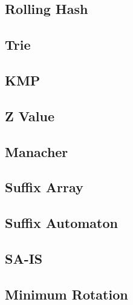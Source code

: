 \documentclass[a4paper,10pt,twocolumn,oneside]{article}
\begin{document}
\subsection{Rolling Hash}


\subsection{Trie}


\subsection{KMP}


\subsection{Z Value}


\subsection{Manacher}


% 

\subsection{Suffix Array}


\subsection{Suffix Automaton}


\subsection{SA-IS}


\subsection{Minimum Rotation}

\end{document}
